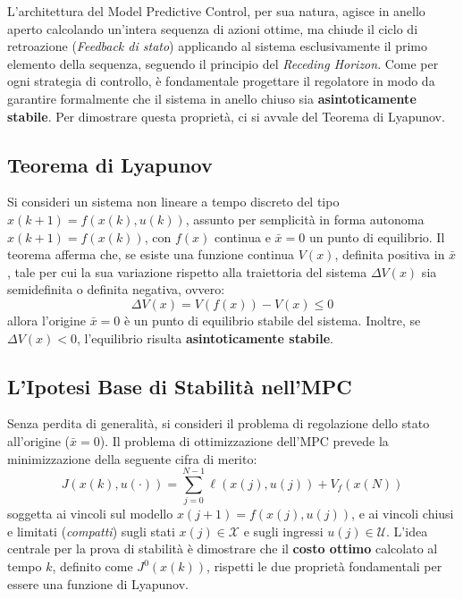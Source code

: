 L'architettura del Model Predictive Control, per sua natura, agisce in anello aperto calcolando un'intera sequenza di azioni ottime, ma chiude il ciclo di retroazione (\textit{Feedback di stato}) applicando al sistema esclusivamente il primo elemento della sequenza, seguendo il principio del \textit{Receding Horizon}. 
Come per ogni strategia di controllo, è fondamentale progettare il regolatore in modo da garantire formalmente che il sistema in anello chiuso sia \textbf{asintoticamente stabile}. Per dimostrare questa proprietà, ci si avvale del Teorema di Lyapunov.

\subsection{Teorema di Lyapunov}
Si consideri un sistema non lineare a tempo discreto del tipo $x(k+1) = f(x(k), u(k))$, assunto per semplicità in forma autonoma $x(k+1) = f(x(k))$, con $f(x)$ continua e $\bar{x} = 0$ un punto di equilibrio. Il teorema afferma che, se esiste una funzione continua $V(x)$, definita positiva in $\bar{x}$, tale per cui la sua variazione rispetto alla traiettoria del sistema $\Delta V(x)$ sia semidefinita o definita negativa, ovvero:
\begin{equation}
	\Delta V(x) = V(f(x)) - V(x) \le 0
\end{equation}
allora l'origine $\bar{x} = 0$ è un punto di equilibrio stabile del sistema. Inoltre, se $\Delta V(x) < 0$, l'equilibrio risulta \textbf{asintoticamente stabile}.

\subsection{L'Ipotesi Base di Stabilità nell'MPC}
Senza perdita di generalità, si consideri il problema di regolazione dello stato all'origine ($\bar{x} = 0$). Il problema di ottimizzazione dell'MPC prevede la minimizzazione della seguente cifra di merito:
\begin{equation}
	J(x(k), u(\cdot)) = \sum_{j=0}^{N-1} \ell(x(j), u(j)) + V_f(x(N))
\end{equation}
soggetta ai vincoli sul modello $x(j+1) = f(x(j), u(j))$, e ai vincoli chiusi e limitati (\textit{compatti}) sugli stati $x(j) \in \mathcal{X}$ e sugli ingressi $u(j) \in \mathcal{U}$.
L'idea centrale per la prova di stabilità è dimostrare che il \textbf{costo ottimo} calcolato al tempo $k$, definito come $J^0(x(k))$, rispetti le due proprietà fondamentali per essere una funzione di Lyapunov.


